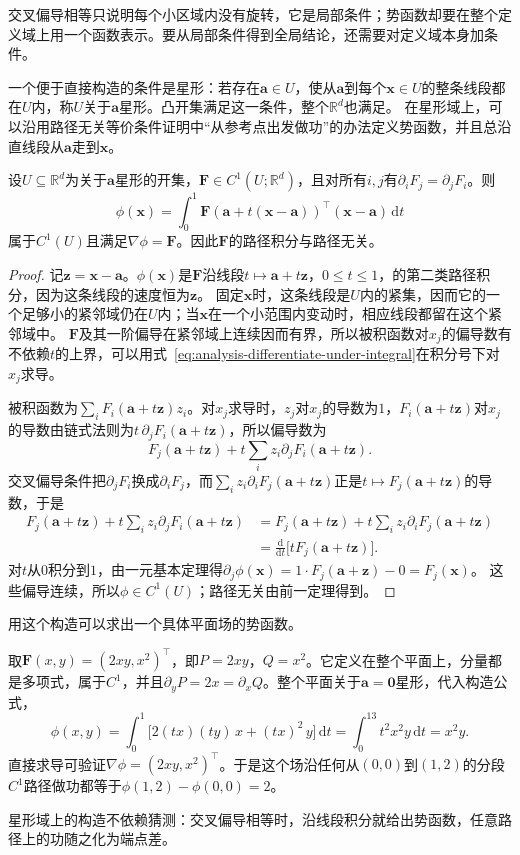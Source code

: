 交叉偏导相等只说明每个小区域内没有旋转，它是局部条件；势函数却要在整个定义域上用一个函数表示。要从局部条件得到全局结论，还需要对定义域本身加条件。

一个便于直接构造的条件是星形：若存在$\bm a\in U$，使从$\bm a$到每个$\bm x\in U$的整条线段都在$U$内，称$U$关于$\bm a$星形。凸开集满足这一条件，整个$\mathbb R^d$也满足。
在星形域上，可以沿用路径无关等价条件证明中“从参考点出发做功”的办法定义势函数，并且总沿直线段从$\bm a$走到$\bm x$。
\begin{theorem}[星形域上势函数的构造]
设$U\subseteq\mathbb R^d$为关于$\bm a$星形的开集，$\bm F\in C^1(U;\mathbb R^d)$，且对所有$i,j$有$\partial_iF_j=\partial_jF_i$。则
\[
 \phi(\bm x)=\int_0^1\bm F(\bm a+t(\bm x-\bm a))^\top(\bm x-\bm a)\,\mathrm dt
\]
属于$C^1(U)$且满足$\nabla\phi=\bm F$。因此$\bm F$的路径积分与路径无关。
\end{theorem}
\begin{proof}
记$\bm z=\bm x-\bm a$。$\phi(\bm x)$是$\bm F$沿线段$t\mapsto\bm a+t\bm z$，$0\leq t\leq1$，的第二类路径积分，因为这条线段的速度恒为$\bm z$。
固定$\bm x$时，这条线段是$U$内的紧集，因而它的一个足够小的紧邻域仍在$U$内；当$\bm x$在一个小范围内变动时，相应线段都留在这个紧邻域中。
$\bm F$及其一阶偏导在紧邻域上连续因而有界，所以被积函数对$x_j$的偏导数有不依赖$t$的上界，可以用式~\eqref{eq:analysis-differentiate-under-integral}在积分号下对$x_j$求导。

被积函数为$\sum_iF_i(\bm a+t\bm z)z_i$。对$x_j$求导时，$z_j$对$x_j$的导数为$1$，$F_i(\bm a+t\bm z)$对$x_j$的导数由链式法则为$t\,\partial_jF_i(\bm a+t\bm z)$，所以偏导数为
\[
 F_j(\bm a+t\bm z)+t\sum_i z_i\partial_jF_i(\bm a+t\bm z).
\]
交叉偏导条件把$\partial_jF_i$换成$\partial_iF_j$，而$\sum_iz_i\partial_iF_j(\bm a+t\bm z)$正是$t\mapsto F_j(\bm a+t\bm z)$的导数，于是
\[
 \begin{aligned}
 F_j(\bm a+t\bm z)+t\sum_i z_i\partial_jF_i(\bm a+t\bm z)
 &=F_j(\bm a+t\bm z)+t\sum_i z_i\partial_iF_j(\bm a+t\bm z)\\
 &=\frac{\mathrm d}{\mathrm dt}\bigl[tF_j(\bm a+t\bm z)\bigr].
 \end{aligned}
\]
对$t$从$0$积分到$1$，由一元基本定理得$\partial_j\phi(\bm x)=1\cdot F_j(\bm a+\bm z)-0=F_j(\bm x)$。
这些偏导连续，所以$\phi\in C^1(U)$；路径无关由前一定理得到。
\end{proof}

用这个构造可以求出一个具体平面场的势函数。
\begin{example}[沿线段构造势函数$x^2y$]
取$\bm F(x,y)=(2xy,x^2)^\top$，即$P=2xy$，$Q=x^2$。它定义在整个平面上，分量都是多项式，属于$C^1$，并且$\partial_yP=2x=\partial_xQ$。整个平面关于$\bm a=\bm0$星形，代入构造公式，
\[
 \phi(x,y)=\int_0^1\bigl[2(tx)(ty)\,x+(tx)^2\,y\bigr]\,\mathrm dt
 =\int_0^13t^2x^2y\,\mathrm dt=x^2y.
\]
直接求导可验证$\nabla\phi=(2xy,x^2)^\top$。于是这个场沿任何从$(0,0)$到$(1,2)$的分段$C^1$路径做功都等于$\phi(1,2)-\phi(0,0)=2$。
\end{example}
星形域上的构造不依赖猜测：交叉偏导相等时，沿线段积分就给出势函数，任意路径上的功随之化为端点差。

